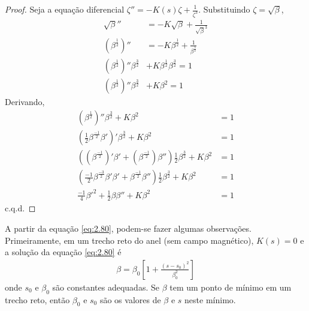 \begin{proof}
	Seja a equação diferencial $\zeta'' = -K(s)\zeta + \frac{1}{\zeta^3}$. Substituindo $\zeta = \sqrt{\beta}$,
	\begin{align*}
		\sqrt{\beta}'' &= -K\sqrt{\beta} + \frac{1}{\sqrt{\beta}^3}\\
		\left(\beta^\frac{1}{2}\right)'' &= -K\beta^\frac{1}{2} + \frac{1}{\beta^\frac{3}{2}}\\
		\left(\beta^\frac{1}{2}\right)''\beta^\frac{3}{2} &+ K\beta^\frac{1}{2} \beta^\frac{3}{2} = 1\\
		\left(\beta^\frac{1}{2}\right)''\beta^\frac{3}{2} &+ K\beta^2 = 1
	\end{align*}
	Derivando,
	\begin{align*}
		\left(\beta^\frac{1}{2}\right)''\beta^\frac{3}{2} + K\beta^2 &= 1\\
		\left(\frac{1}{2}\beta^\frac{-1}{2}\beta'\right)'\beta^\frac{3}{2} + K\beta^2 &= 1\\
		\left(\left(\beta^\frac{-1}{2}\right)'\beta' + \left(\beta^\frac{-1}{2}\right)\beta''\right)\frac{1}{2}\beta^\frac{3}{2} + K\beta^2 &= 1\\
		\left(\frac{-1}{2}\beta^\frac{-3}{2}\beta'\beta' + \beta^\frac{-1}{2}\beta''\right)\frac{1}{2}\beta^\frac{3}{2} + K\beta^2 &= 1\\
		\frac{-1}{4}\beta'^2 + \frac{1}{2}\beta\beta'' + K\beta^2 &= 1
	\end{align*}
	c.q.d.
\end{proof}

A partir da equação \eqref{eq:2.80}, podem-se fazer algumas observações. Primeiramente, em um trecho reto do anel (sem campo magnético), $K(s)=0$ e a solução da equação \eqref{eq:2.80} é
\begin{align}
	\beta = \beta_0\left[1+\frac{(s-s_0)^2}{\beta_0^2}\right]
\end{align}
onde $s_0$ e $\beta_0$ são constantes adequadas. Se $\beta$ tem um ponto de mínimo em um trecho reto, então $\beta_0$ e $s_0$ são os valores de $\beta$ e $s$ neste mínimo.

